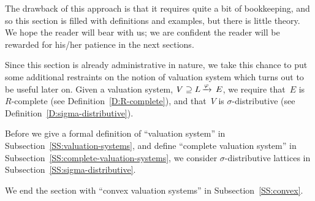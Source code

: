 \documentclass[main.tex]{subfiles}
\begin{document}
The drawback of this approach is that it requires
quite a bit of bookkeeping,
and so this section
is filled with definitions and examples,
but there is little theory.
We hope the reader will bear with us;
we are confident the reader will be rewarded
for his/her patience
in the next sections.

Since this section
 is already  administrative in nature,
we take this chance
to put 
 some additional restraints on
the notion of valuation system
which turns out to be useful later on.
Given a valuation system,
$V \supseteq L\,\smash{\xrightarrow{\varphi}\,E}$,
we  require that~$E$ is $R$-complete
(see Definition~\ref{D:R-complete}),
and that~$V$ is $\sigma$-distributive
(see Definition~\ref{D:sigma-distributive}).

Before we give a formal definition
of ``valuation system'' 
in Subsection~\ref{SS:valuation-systems},
and define ``complete valuation system''
in Subsection~\ref{SS:complete-valuation-systems},
we consider $\sigma$-distributive lattices
in Subsection~\ref{SS:sigma-distributive}.

We end the section
with ``convex valuation systems''
 in Subsection~\ref{SS:convex}.
%
%
\end{document}
